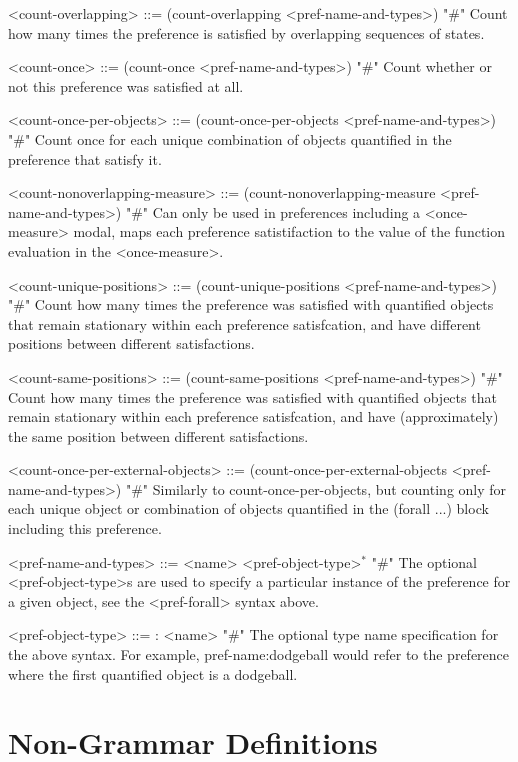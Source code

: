 \documentclass{article}
\begin{document}
\begin{grammar}
<count-overlapping> ::= (count-overlapping <pref-name-and-types>) "#" Count how many times the preference is satisfied by overlapping sequences of states.

<count-once> ::= (count-once <pref-name-and-types>) "#" Count whether or not this preference was satisfied at all.

<count-once-per-objects> ::= (count-once-per-objects <pref-name-and-types>) "#" Count once for each unique combination of objects quantified in the preference that satisfy it.

<count-nonoverlapping-measure> ::= (count-nonoverlapping-measure <pref-name-and-types>) "#" Can only be used in preferences including a <once-measure> modal, maps each preference satistifaction to the value of the function evaluation in the <once-measure>.

<count-unique-positions> ::= (count-unique-positions <pref-name-and-types>) "#" Count how many times the preference was satisfied with quantified objects that remain stationary within each preference satisfcation, and have different positions between different satisfactions.

<count-same-positions> ::= (count-same-positions <pref-name-and-types>) "#" Count how many times the preference was satisfied with quantified objects that remain stationary within each preference satisfcation, and have (approximately) the same position between different satisfactions.

<count-once-per-external-objects> ::=  (count-once-per-external-objects <pref-name-and-types>) "#" Similarly to count-once-per-objects, but counting only for each unique object or combination of objects quantified in the (forall ...) block including this preference.

<pref-name-and-types> ::= <name> <pref-object-type>$^*$ "#" The optional <pref-object-type>s are used to specify a particular instance of the preference for a given object, see the <pref-forall> syntax above.

    <pref-object-type> ::= : <name>  "#" The optional type name specification for the above syntax. For example, pref-name:dodgeball would refer to the preference where the first quantified object is a dodgeball.
    



\end{grammar}



\section{Non-Grammar Definitions}
\end{document}
